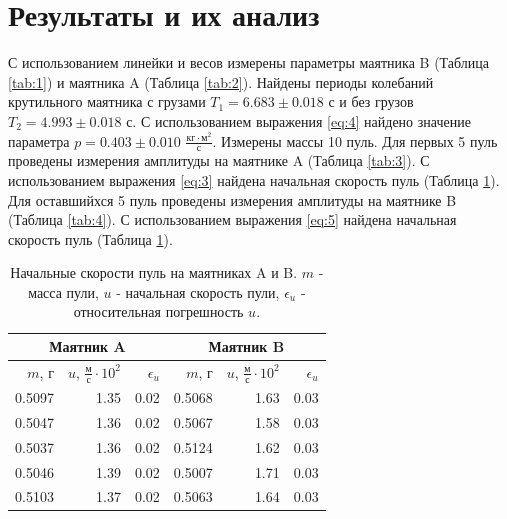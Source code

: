 \documentclass[12pt]{article}
\begin{document}
\section{Результаты и их анализ}
С использованием линейки и весов измерены параметры маятника B (Таблица \ref{tab:1}) и маятника A (Таблица \ref{tab:2}).
Найдены периоды колебаний крутильного маятника с грузами $T_1 = 6.683 \pm 0.018$ с и без грузов $T_2 = 4.993 \pm 0.018$ с. 
С использованием выражения \ref{eq:4} найдено значение параметра $p = 0.403 \pm 0.010$ $\frac{\textrm{кг}\cdot\textrm{м}^2}{\textrm{с}}$.
Измерены массы 10 пуль. Для первых 5 пуль проведены измерения амплитуды на маятнике A (Таблица \ref{tab:3}). С использованием 
выражения \ref{eq:3} найдена начальная скорость пуль (Таблица \ref{tab:5}). Для оставшийхся 5 пуль проведены измерения амплитуды на маятнике B
 (Таблица \ref{tab:4}). С использованием выражения \ref{eq:5} найдена начальная скорость пуль (Таблица \ref{tab:5}).
\begin{table}[H]
    \centering
    \begin{tabular}{|r|r|r|r|r|r|}
        \hline
        \multicolumn{3}{|c|}{Маятник A} & 
        \multicolumn{3}{|c|}{Маятник B}                                                                                                                                                \\
        \hline
        $m$, г                                       & $u$, $\frac{\textrm{м}}{\textrm{с}} \cdot 10^2$ & $\epsilon_u$ & $m$, г & $u$, $\frac{\textrm{м}}{\textrm{с}} \cdot 10^2$ & $\epsilon_u$ \\
        \hline
        0.5097                                       & 1.35                                            & 0.02         & 0.5068 & 1.63                                            & 0.03         \\
        0.5047                                       & 1.36                                            & 0.02         & 0.5067 & 1.58                                            & 0.03         \\
        0.5037                                       & 1.36                                            & 0.02         & 0.5124 & 1.62                                            & 0.03         \\
        0.5046                                       & 1.39                                            & 0.02         & 0.5007 & 1.71                                            & 0.03         \\
        0.5103                                       & 1.37                                            & 0.02         & 0.5063 & 1.64                                            & 0.03         \\
        \hline
    \end{tabular}
    
    \caption{Начальные скорости пуль на маятниках A и B. $m$ - масса пули, $u$ - начальная скорость пули,
        $\epsilon_u$ - относительная погрешность $u$.}
    \label{tab:5}
\end{table}
\end{document}
